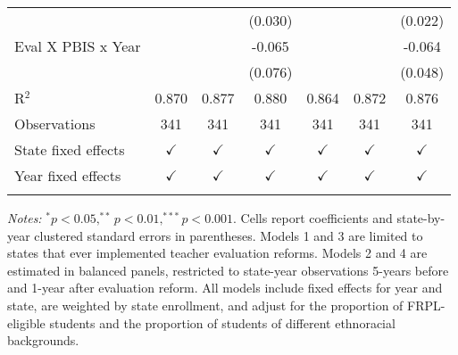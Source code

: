 \begin{table}[!htbp]
\begin{tabular}{lcccccc}
                                              &               &               & (0.030)       &               &               & (0.022)\\ 
      Eval X PBIS x Year                      &               &               & -0.065        &               &               & -0.064\\   
                                              &               &               & (0.076)       &               &               & (0.048)\\   
       \midrule
      R$^2$                                   & 0.870         & 0.877         & 0.880         & 0.864         & 0.872         & 0.876\\  
      Observations                            & 341           & 341           & 341           & 341           & 341           & 341\\  
       \midrule
      State fixed effects                     & $\checkmark$  & $\checkmark$  & $\checkmark$  & $\checkmark$  & $\checkmark$  & $\checkmark$\\   
      Year fixed effects                      & $\checkmark$  & $\checkmark$  & $\checkmark$  & $\checkmark$  & $\checkmark$  & $\checkmark$\\   
      \hline \hline \\[-1.8ex]
   \end{tabular}
   
   \par \justifying 
   \small \textit{Notes:} $^{*}p<0.05, ^{**}p<0.01, ^{***}p<0.001$. Cells report coefficients and state-by-year clustered standard errors in parentheses. Models 1 and 3 are limited to states that ever implemented teacher evaluation reforms. Models 2 and 4 are estimated in balanced panels, restricted to state-year observations 5-years before and 1-year after evaluation reform. All models include fixed effects for year and state, are weighted by state enrollment, and adjust for the proportion of FRPL-eligible students and the proportion of students of different ethnoracial backgrounds.
\end{table}


